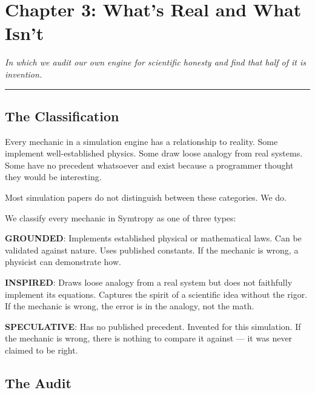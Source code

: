 \chapter{Chapter 3: What's Real and What Isn't}\label{chapter-3-whats-real-and-what-isnt}

\emph{In which we audit our own engine for scientific honesty and find that half of it is invention.}

\begin{center}\rule{0.5\linewidth}{0.5pt}\end{center}

\section{The Classification}\label{the-classification}

Every mechanic in a simulation engine has a relationship to reality. Some implement well-established physics. Some draw loose analogy from real systems. Some have no precedent whatsoever and exist because a programmer thought they would be interesting.

Most simulation papers do not distinguish between these categories. We do.

We classify every mechanic in Symtropy as one of three types:

\textbf{GROUNDED}: Implements established physical or mathematical laws. Can be validated against nature. Uses published constants. If the mechanic is wrong, a physicist can demonstrate how.

\textbf{INSPIRED}: Draws loose analogy from a real system but does not faithfully implement its equations. Captures the spirit of a scientific idea without the rigor. If the mechanic is wrong, the error is in the analogy, not the math.

\textbf{SPECULATIVE}: Has no published precedent. Invented for this simulation. If the mechanic is wrong, there is nothing to compare it against --- it was never claimed to be right.

\section{The Audit}\label{the-audit}

